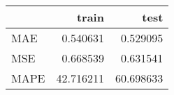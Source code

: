 \begin{tabular}{lrr}
\toprule
{} &      train &       test \\
\midrule
MAE  &   0.540631 &   0.529095 \\
MSE  &   0.668539 &   0.631541 \\
MAPE &  42.716211 &  60.698633 \\
\bottomrule
\end{tabular}
